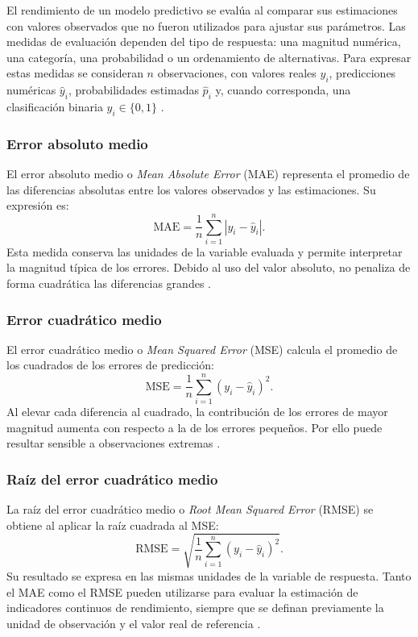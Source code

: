 El rendimiento de un modelo predictivo se evalúa al comparar sus estimaciones con valores observados que no fueron utilizados para ajustar sus parámetros. Las medidas de evaluación dependen del tipo de respuesta: una magnitud numérica, una categoría, una probabilidad o un ordenamiento de alternativas. Para expresar estas medidas se consideran $n$ observaciones, con valores reales $y_i$, predicciones numéricas $\hat y_i$, probabilidades estimadas $\hat p_i$ y, cuando corresponda, una clasificación binaria $y_i\in\{0,1\}$ \cite{hastie2009elements}.

\subsubsection{Error absoluto medio}
El error absoluto medio o \textit{Mean Absolute Error} (MAE) representa el promedio de las diferencias absolutas entre los valores observados y las estimaciones. Su expresión es:
\begin{equation}
\mathrm{MAE}=\frac{1}{n}\sum_{i=1}^{n}|y_i-\hat y_i|.
\end{equation}
Esta medida conserva las unidades de la variable evaluada y permite interpretar la magnitud típica de los errores. Debido al uso del valor absoluto, no penaliza de forma cuadrática las diferencias grandes \cite{hastie2009elements}.

\subsubsection{Error cuadrático medio}
El error cuadrático medio o \textit{Mean Squared Error} (MSE) calcula el promedio de los cuadrados de los errores de predicción:
\begin{equation}
\mathrm{MSE}=\frac{1}{n}\sum_{i=1}^{n}(y_i-\hat y_i)^2.
\end{equation}
Al elevar cada diferencia al cuadrado, la contribución de los errores de mayor magnitud aumenta con respecto a la de los errores pequeños. Por ello puede resultar sensible a observaciones extremas \cite{hastie2009elements}.

\subsubsection{Raíz del error cuadrático medio}
La raíz del error cuadrático medio o \textit{Root Mean Squared Error} (RMSE) se obtiene al aplicar la raíz cuadrada al MSE:
\begin{equation}
\mathrm{RMSE}=\sqrt{\frac{1}{n}\sum_{i=1}^{n}(y_i-\hat y_i)^2}.
\end{equation}
Su resultado se expresa en las mismas unidades de la variable de respuesta. Tanto el MAE como el RMSE pueden utilizarse para evaluar la estimación de indicadores continuos de rendimiento, siempre que se definan previamente la unidad de observación y el valor real de referencia \cite{hastie2009elements}.

